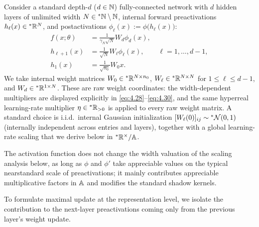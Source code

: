 Consider a standard depth-$d$ ($d \in \mathbb{N}$) fully-connected network with $d$ hidden layers of unlimited width $N \in {}^*\mathbb{N} \setminus \mathbb{N}$, internal forward preactivations $h_\ell(x) \in {}^*\mathbb{R}^N$, and postactivations $\phi_\ell(x) := \phi\bigl(h_\ell(x)\bigr)$:
\begin{align}
f(x; \theta) &= \frac{1}{\gamma_N\sqrt{N}} W_d \phi_d(x), \label{eq:4.28} \\
h_{\ell+1}(x) &= \frac{1}{\sqrt{N}} W_\ell \phi_\ell(x), \qquad \ell = 1, \dots, d - 1, \label{eq:4.29} \\
h_1(x) &= \frac{1}{\sqrt{n_0}} W_0 x. \label{eq:4.30}
\end{align}
We take internal weight matrices $W_0 \in {}^*\mathbb{R}^{N \times n_0}$, $W_\ell \in {}^*\mathbb{R}^{N \times N}$ for $1 \le \ell \le d - 1$, and $W_d \in {}^*\mathbb{R}^{1 \times N}$. These are raw weight coordinates: the width-dependent multipliers are displayed explicitly in \eqref{eq:4.28}--\eqref{eq:4.30}, and the same hyperreal learning-rate multiplier $\eta \in {}^*\mathbb{R}_{>0}$ is applied to every raw weight matrix. A standard choice is i.i.d.\ internal Gaussian initialization $[W_\ell(0)]_{ij} \sim {}^*\mathcal{N}(0, 1)$ (internally independent across entries and layers), together with a global learning-rate scaling that we derive below in ${}^*\mathbb{R}^\times / \mathbb{A}$.

The activation function does not change the width valuation of the scaling analysis below, as long as $\phi$ and $\phi'$ take appreciable values on the typical nearstandard scale of preactivations; it mainly contributes appreciable multiplicative factors in $\mathbb{A}$ and modifies the standard shadow kernels.

To formulate maximal update at the representation level, we isolate the contribution to the next-layer preactivations coming only from the previous layer's weight update.

